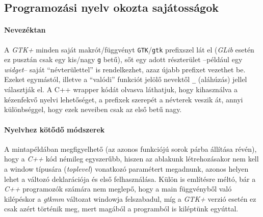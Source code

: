 \subsection{Programozási nyelv okozta sajátosságok}

\paragraph{Nevezéktan}

A \textit{GTK+} minden saját makrót/függvényt \texttt{GTK}/\texttt{gtk} prefixszel lát el (\textit{GLib} esetén ez pusztán csak egy kis/nagy \texttt{g} betű), sőt egy adott részterület --például egy \textit{widget}-- saját ``névterülettel'' is rendelkezhet, azaz újabb prefixet vezethet be. Ezeket egymástól, illetve a ``valódi'' funkciót jelölő nevektől \texttt{\_} (aláhúzás) jellel választják el. A C++ wrapper kódát olvasva láthatjuk, hogy kihasználva a kézenfekvő nyelvi lehetőséget, a prefixek szerepét a névterek veszik át, annyi különbséggel, hogy ezek neveiben csak az első betű nagy.

\paragraph{Nyelvhez kötődő módszerek}

A mintapéldában megfigyelhető (az azonos funkciójú sorok párba állítása révén), hogy a \textit{C++} kód némileg egyszerűbb, hiszen az ablakunk létrehozásakor nem kell a window típusára (\textit{toplevel}) vonatkozó paramétert megadnunk, azonos helyen lehet a változó deklarációja és első felhasználása. Külön is említésre méltó, bár a \textit{C++} programozók számára nem meglepő, hogy a main függvényből való kilépéskor a \textit{gtkmm} változat windowja felszabadul, míg a \textit{GTK+} verzió esetén ez csak azért történik meg, mert magából a programból is kiléptünk egyúttal.


